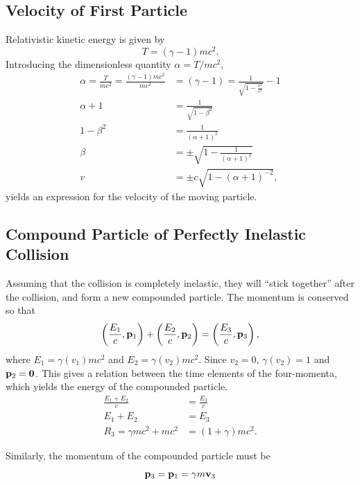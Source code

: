 \documentclass[11pt]{amsart}
\begin{document}
\subsection{Velocity of First Particle}
Relativistic kinetic energy is given by
\begin{equation}
\label{eq:relkinenergy}
T = (\gamma-1)mc^2.
\end{equation}
Introducing the dimensionless quantity $\alpha = T/mc^2$,
\begin{align*}
\alpha = \frac{T}{mc^2} = \frac{(\gamma - 1)mc^2}{mc^2} &= (\gamma-1) = \frac{1}{\sqrt{1-\frac{v^2}{c^2}}} - 1 \\
\alpha + 1 &= \frac{1}{\sqrt{1-\beta^2}} \\
1 - \beta^2 &= \frac{1}{(\alpha + 1)^2} \\
\beta &= \pm \sqrt{1 - \frac{1}{(\alpha + 1)^2}} \\
v &= \pm c \sqrt{1-(\alpha + 1)^{-2}},
\end{align*}
yields an expression for the velocity of the moving particle.

\subsection{Compound Particle of Perfectly Inelastic Collision}
Assuming that the collision is completely inelastic, they will ``stick together'' after the collision, and form a new compounded particle. The momentum is conserved so that
\begin{equation}
\label{eq:momentumconservation1}
\left(\frac{E_1}{c}, \vb{p}_1 \right) + \left(\frac{E_2}{c}, \vb{p}_2 \right) = \left(\frac{E_3}{c}, \vb{p}_3 \right) ,
\end{equation}
where $E_1 = \gamma(v_1)mc^2$ and $E_2 = \gamma(v_2)mc^2$. Since $v_2 = 0$, $\gamma(v_2) = 1$ and $\vb{p}_2 = \vb{0}$. This gives a relation between the time elements of the four-momenta, which yields the energy of the compounded particle.
\begin{align}
\frac{E_1 + E_2}{c} &= \frac{E_3}{c} \nonumber \\
E_1 + E_2 &= E_3 \nonumber \\
R_3 =  \gamma mc^2 + mc^2 &= (1 + \gamma)mc^2.
\end{align}

Similarly, the momentum of the compounded particle must be
\begin{equation}
\vb{p}_3 = \vb{p}_1 = \gamma m\vb{v}_3 
\end{equation}
\end{document}
